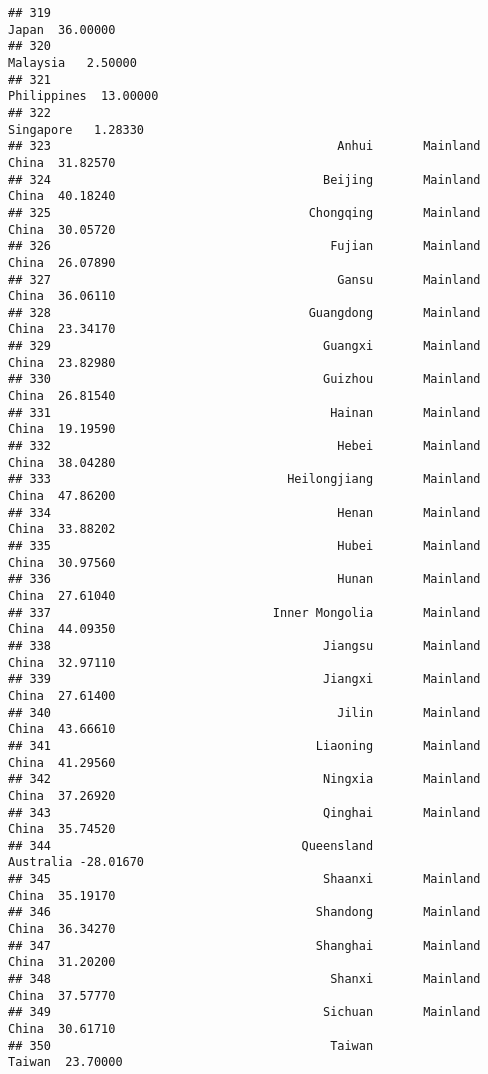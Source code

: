 \documentclass[
]{article}
\begin{document}
\begin{verbatim}
## 319                                                             Japan  36.00000
## 320                                                          Malaysia   2.50000
## 321                                                       Philippines  13.00000
## 322                                                         Singapore   1.28330
## 323                                        Anhui       Mainland China  31.82570
## 324                                      Beijing       Mainland China  40.18240
## 325                                    Chongqing       Mainland China  30.05720
## 326                                       Fujian       Mainland China  26.07890
## 327                                        Gansu       Mainland China  36.06110
## 328                                    Guangdong       Mainland China  23.34170
## 329                                      Guangxi       Mainland China  23.82980
## 330                                      Guizhou       Mainland China  26.81540
## 331                                       Hainan       Mainland China  19.19590
## 332                                        Hebei       Mainland China  38.04280
## 333                                 Heilongjiang       Mainland China  47.86200
## 334                                        Henan       Mainland China  33.88202
## 335                                        Hubei       Mainland China  30.97560
## 336                                        Hunan       Mainland China  27.61040
## 337                               Inner Mongolia       Mainland China  44.09350
## 338                                      Jiangsu       Mainland China  32.97110
## 339                                      Jiangxi       Mainland China  27.61400
## 340                                        Jilin       Mainland China  43.66610
## 341                                     Liaoning       Mainland China  41.29560
## 342                                      Ningxia       Mainland China  37.26920
## 343                                      Qinghai       Mainland China  35.74520
## 344                                   Queensland            Australia -28.01670
## 345                                      Shaanxi       Mainland China  35.19170
## 346                                     Shandong       Mainland China  36.34270
## 347                                     Shanghai       Mainland China  31.20200
## 348                                       Shanxi       Mainland China  37.57770
## 349                                      Sichuan       Mainland China  30.61710
## 350                                       Taiwan               Taiwan  23.70000

\end{verbatim}
\end{document}
